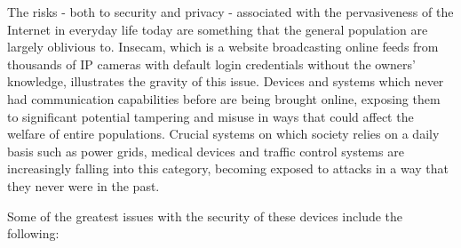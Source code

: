 The risks - both to security and privacy - associated with the pervasiveness of the Internet in everyday life today are something that the general population are largely oblivious to. Insecam, which is a website broadcasting online feeds from thousands of IP cameras with default login credentials without the owners' knowledge, illustrates the gravity of this issue. \cite{Insecam} Devices and systems which never had communication capabilities before are being brought online, exposing them to significant potential tampering and misuse in ways that could affect the welfare of entire populations. Crucial systems on which society relies on a daily basis such as power grids, medical devices and traffic control systems are increasingly falling into this category, becoming exposed to attacks in a way that they never were in the past. 

Some of the greatest issues with the security of these devices include the following:


